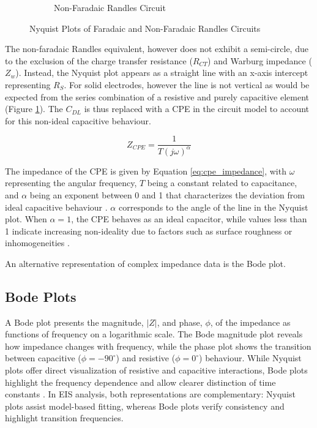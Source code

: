 \begin{figure}[H]
\begin{subfigure}{0.45\textwidth}
        \caption[Non-Faradaic Randles Circuit]{Non-Faradaic Randles Circuit \cite{xieReviewAdvancementsNanoscale2020a}}
        \label{fig:RandlesNonFaradaicNyquist}    
    \end{subfigure}
    \caption{Nyquist Plots of Faradaic and Non-Faradaic Randles Circuits}
    \label{fig:randles_nyquist}
\end{figure}

The non-faradaic Randles equivalent, however does not exhibit a semi-circle, due to the exclusion of the charge transfer resistance ($R_{CT}$) and Warburg impedance ($Z_w$). Instead, the Nyquist plot appears as a straight line with an x-axis intercept representing $R_S$. For solid electrodes, however the line is not vertical as would be expected from the series combination of a resistive and purely capacitive element \cite{xieReviewAdvancementsNanoscale2020a} (Figure \ref{fig:RandlesNonFaradaicNyquist}). The $C_{DL}$ is thus replaced with a \ac{CPE} in the circuit model to account for this non-ideal capacitive behaviour.

\begin{equation}
    Z_{CPE} = \frac{1}{T(j\omega)^{\alpha}}
    \label{eq:cpe_impedance}
\end{equation}

The impedance of the \ac{CPE} is given by Equation \ref{eq:cpe_impedance}, with $\omega$ representing the angular frequency, $T$ being a constant related to capacitance, and $\alpha$ being an exponent between 0 and 1 that characterizes the deviation from ideal capacitive behaviour \cite{xieReviewAdvancementsNanoscale2020a}. $\alpha$ corresponds to the angle of the line in the Nyquist plot. When $\alpha = 1$, the \ac{CPE} behaves as an ideal capacitor, while values less than 1 indicate increasing non-ideality due to factors such as surface roughness or inhomogeneities \cite{xieReviewAdvancementsNanoscale2020a}.

An alternative representation of complex impedance data is the Bode plot.

\subsection{Bode Plots}

A Bode plot presents the magnitude, $|Z|$, and phase, $\phi$, of the impedance as functions of frequency on a logarithmic scale. The Bode magnitude plot reveals how impedance changes with frequency, while the phase plot shows the transition between capacitive ($\phi = -90^\circ$)  and resistive ($\phi = 0^\circ$) behaviour. While Nyquist plots offer direct visualization of resistive and capacitive interactions, Bode plots highlight the frequency dependence and allow clearer distinction of time constants \cite{BodeNyquistPlot}. In EIS analysis, both representations are complementary: Nyquist plots assist model-based fitting, whereas Bode plots verify consistency and highlight transition frequencies.

